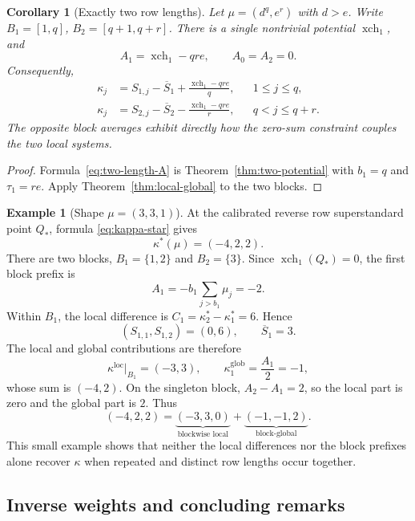 \documentclass[11pt]{article}
\newtheorem{corollary}[theorem]{Corollary}
\theoremstyle{definition}
\newtheorem{example}[theorem]{Example}
\theoremstyle{remark}
\newcommand{\xch}{\operatorname{xch}}
\begin{document}
\begin{corollary}[Exactly two row lengths]\label{cor:two-lengths}
Let \(\mu=(d^q,e^r)\) with \(d>e\).  Write
\(B_1=[1,q]\), \(B_2=[q+1,q+r]\).  There is a single nontrivial potential
\(\xch_1\), and
\begin{equation}\label{eq:two-length-A}
 A_1=\xch_1-qre,\qquad A_0=A_2=0.
\end{equation}
Consequently,
\begin{align}
 \kappa_j&=S_{1,j}-\overline S_1+\frac{\xch_1-qre}{q},
 &&1\le j\le q,
 \label{eq:two-length-first}\\
 \kappa_j&=S_{2,j}-\overline S_2-\frac{\xch_1-qre}{r},
 &&q<j\le q+r.
 \label{eq:two-length-second}
\end{align}
The opposite block averages exhibit directly how the zero-sum constraint couples the
two local systems.
\end{corollary}

\begin{proof}
Formula~\eqref{eq:two-length-A} is Theorem~\ref{thm:two-potential} with
\(b_1=q\) and \(\tau_1=re\).  Apply Theorem~\ref{thm:local-global} to the two blocks.
\end{proof}

\begin{example}[Shape \(\mu=(3,3,1)\)]\label{ex:local-global}
At the calibrated reverse row superstandard point \(Q_*\), formula
\eqref{eq:kappa-star} gives
\[
 \kappa^*(\mu)=(-4,2,2).
\]
There are two blocks, \(B_1=\{1,2\}\) and \(B_2=\{3\}\).  Since
\(\xch_1(Q_*)=0\), the first block prefix is
\[
 A_1=-b_1\sum_{j>b_1}\mu_j=-2.
\]
Within \(B_1\), the local difference is
\(C_1=\kappa_2^*-\kappa_1^*=6\).  Hence
\[
 (S_{1,1},S_{1,2})=(0,6),\qquad \overline S_1=3.
\]
The local and global contributions are therefore
\[
 \kappa^{\mathrm{loc}}|_{B_1}=(-3,3),
 \qquad
 \kappa^{\mathrm{glob}}_1=\frac{A_1}{2}=-1,
\]
whose sum is \((-4,2)\).  On the singleton block,
\(A_2-A_1=2\), so the local part is zero and the global part is \(2\).  Thus
\[
 (-4,2,2)=\underbrace{(-3,3,0)}_{\text{blockwise local}}
            +\underbrace{(-1,-1,2)}_{\text{block-global}}.
\]
This small example shows that neither the local differences nor the block prefixes alone
recover \(\kappa\) when repeated and distinct row lengths occur together.
\end{example}

\subsection{Inverse weights and concluding remarks}
\end{document}
